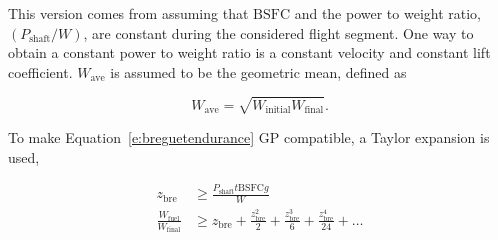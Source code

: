 %
% 
% 
% 
% 

This version comes from assuming that $\text{BSFC}$ and the power to weight ratio, $(P_{\text{shaft}}/W)$, are constant during the considered flight segment. 
One way to obtain a constant power to weight ratio is a constant velocity and constant lift coefficient.\cite{br2}
$W_{\text{ave}}$ is assumed to be the geometric mean, defined as

% 
% 
% 
% 

\begin{equation}
    \label{e:gpmean}
    W_{\text{ave}} = \sqrt{W_{\text{initial}}W_{\text{final}}}.
\end{equation}

    To make Equation~\eqref{e:breguetendurance} GP compatible, a Taylor expansion is used,\cite{hoburgthesis}

\begin{align}
    \label{e:brzbre}
    z_{\text{bre}} &\geq \frac{P_{\text{shaft}}t \text{BSFC} g}{W}\\
    \label{e:brtaylor}
    \frac{W_{\text{fuel}}}{W_\text{final}} &\geq z_{\text{bre}} + \frac{z_{\text{bre}}^2}{2} + \frac{z_{\text{bre}}^3}{6} + \frac{z_{\text{bre}}^4}{24} + \dots
\end{align}


